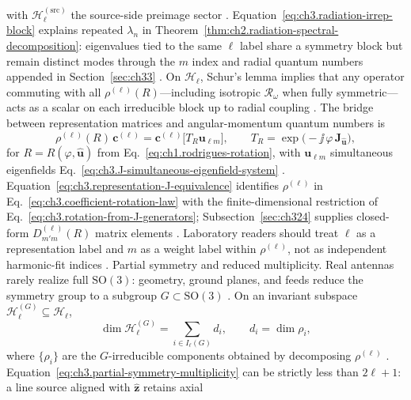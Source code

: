 with \(\mathcal{H}_{\ell}^{(\mathrm{src})}\) the source-side preimage sector
\cite{stratton1941}. Equation~\eqref{eq:ch3.radiation-irrep-block} explains repeated
\(\lambda_n\) in Theorem~\ref{thm:ch2.radiation-spectral-decomposition}: eigenvalues tied to the
same \(\ell\) label share a symmetry block but remain distinct modes through the \(m\) index and
radial quantum numbers appended in Section~\ref{sec:ch33} \cite{hansen1988}. On
\(\mathcal{H}_{\ell}\), Schur's lemma implies that any operator commuting with all
\(\rho^{(\ell)}(R)\)---including isotropic \(\mathcal{R}_\omega\) when fully symmetric---acts as a
scalar on each irreducible block up to radial coupling \cite{jackson1999}.
The bridge between representation matrices and angular-momentum quantum numbers is
\begin{equation}
\label{eq:ch3.representation-J-equivalence}
\rho^{(\ell)}(R)\,\mathbf{c}^{(\ell)}
=
\mathbf{c}^{(\ell)}\big[T_R\mathbf{u}_{\ell m}\big],
\qquad
T_R=\exp\!\big(-\jj\,\varphi\,\mathbf{J}_{\hat{\mathbf{u}}}\big),
\end{equation}
for \(R=R(\varphi,\hat{\mathbf{u}})\) from Eq.~\eqref{eq:ch1.rodrigues-rotation}, with
\(\mathbf{u}_{\ell m}\) simultaneous eigenfields Eq.~\eqref{eq:ch3.J-simultaneous-eigenfield-system}
\cite{jackson1999}. Equation~\eqref{eq:ch3.representation-J-equivalence} identifies
\(\rho^{(\ell)}\) in Eq.~\eqref{eq:ch3.coefficient-rotation-law} with the finite-dimensional
restriction of Eq.~\eqref{eq:ch3.rotation-from-J-generators}; Subsection~\ref{sec:ch324} supplies
closed-form \(D^{(\ell)}_{m'm}(R)\) matrix elements \cite{hansen1988}. Laboratory readers
should treat \(\ell\) as a representation label and \(m\) as a weight label within
\(\rho^{(\ell)}\), not as independent harmonic-fit indices \cite{stratton1941}.
Partial symmetry and reduced multiplicity. Real antennas rarely realize full \(\mathrm{SO}(3)\): geometry, ground planes, and feeds reduce the
symmetry group to a subgroup \(G\subset\mathrm{SO}(3)\) \cite{harrington2001}. On an
invariant subspace \(\mathcal{H}_{\ell}^{(G)}\subseteq\mathcal{H}_{\ell}\),
\begin{equation}
\label{eq:ch3.partial-symmetry-multiplicity}
\dim\mathcal{H}_{\ell}^{(G)}
=
\sum_{i\in I_{\ell}(G)} d_i,
\qquad
d_i=\dim\rho_i,
\end{equation}
where \(\{\rho_i\}\) are the \(G\)-irreducible components obtained by decomposing \(\rho^{(\ell)}\)
\cite{jackson1999}. Equation~\eqref{eq:ch3.partial-symmetry-multiplicity} can be
strictly less than \(2\ell+1\): a line source aligned with \(\hat{\mathbf{z}}\) retains axial
